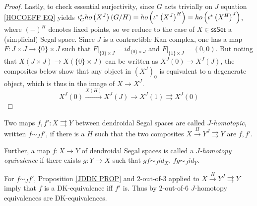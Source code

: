 \documentclass[a4paper,10pt
 ,draft
]{article}%
\begin{document}
\begin{proof}
Lastly, to check essential surjectivity, 
since $G$ acts trivially on $J$ equation \eqref{HOCOEFF EQ} yields
$\iota_G^{\**} ho\left( X^J \right)(G/H)=
ho\left(\iota^{\**}\left(X^J\right)^H\right)=
ho\left(\iota^{\**}\left(X^H\right)^J\right)$,
where $(-)^H$ denotes fixed points,
so we reduce to the case of $X \in \mathsf{ssSet}$ a (simplicial) Segal space.
Since $J$ is a contractible Kan complex,
one has a map 
$F \colon J \times J \to \{0\} \times J$
such that 
$F|_{\{0\}\times J} = id_{\{0\} \times J}$
and
$F|_{\{1\}\times J} = (0,0)$.
But noting that 
$X(J \times J) \to X(\{0\} \times J)$
can be written as 
$X^J(0) \to X^J(J)$, the composites below
show that any object in $\left(X^J\right)_0$ is equivalent to a 
degenerate object, which is thus in the image of $X\to X^J$.
\[
	X^J(0) \xrightarrow{X(H)} 
	X^{J}(J) \to
	X^J(1) \rightrightarrows X^J(0)
\]
%
\end{proof}


\begin{definition}
	Two maps $f,f'\colon X \rightrightarrows Y$ between dendroidal Segal spaces are called \textit{$J$-homotopic}, written $f \sim_J f'$, if
	there is a $H$ such that
	the two composites
	$X \xrightarrow{H} Y^J \rightrightarrows Y$
	are $f,f'$.
	
	Further, a map $f\colon X \to Y$ of dendroidal Segal spaces is called a \textit{$J$-homotopy equivalence} if there exists $g \colon Y \to X$
	such that $gf \sim_J id_X$, $fg \sim_J id_Y$.
\end{definition}


\begin{remark}
	For $f\sim_J f'$, Proposition \ref{JDDK PROP} and 2-out-of-3 applied to $X \xrightarrow{H} Y^J \rightrightarrows Y$ imply that $f$ is a DK-equivalence iff $f'$ is.
	Thus by 2-out-of-6 $J$-homotopy equivalences are DK-equivalences.
\end{remark}
\end{document}
